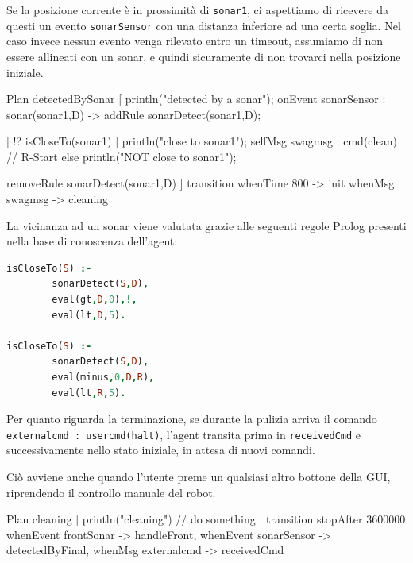 \documentclass{../llncs}
\newcommand{\codescript}[1]{{\mbox{\small{\texttt{#1}}}}\xspace}
\newcommand{\code}[1]{{\color{blue}\small{\texttt{#1}}}}
\begin{document}
Se la posizione corrente è in prossimità di \code{sonar1}, ci aspettiamo di ricevere da questi un evento \codescript{sonarSensor} con una distanza inferiore ad una certa soglia. Nel caso invece nessun evento venga rilevato entro un timeout, assumiamo di non essere allineati con un sonar, e quindi sicuramente di non trovarci nella posizione iniziale.\\

\begin{qacode}[caption={SoftwareAgent, pt2}]
Plan detectedBySonar [
	println("detected by a sonar");
	onEvent sonarSensor : sonar(sonar1,D) -> addRule sonarDetect(sonar1,D);
	
	[ !? isCloseTo(sonar1) ] {
		println("close to sonar1");
		selfMsg swagmsg : cmd(clean) // R-Start
	}
	else
		println("NOT close to sonar1");
		
	removeRule sonarDetect(sonar1,D)
]
transition
	whenTime 800 -> init
	whenMsg swagmsg -> cleaning
\end{qacode}

La vicinanza ad un sonar viene valutata grazie alle seguenti regole Prolog presenti nella base di conoscenza dell'agent:\\

\begin{lstlisting}[language=Prolog, keywordstyle=\color{black}, caption={SoftwareAgent, Rules - pt1}]
isCloseTo(S) :-
		sonarDetect(S,D),
		eval(gt,D,0),!,
		eval(lt,D,5).
	
isCloseTo(S) :-
		sonarDetect(S,D),
		eval(minus,0,D,R),
		eval(lt,R,5).
\end{lstlisting}

\vspace{8px}

Per quanto riguarda la terminazione, se durante la pulizia arriva il comando \codescript{externalcmd : usercmd(halt)}, l'agent transita prima in \codescript{receivedCmd} e successivamente nello stato iniziale, in attesa di nuovi comandi.

Ciò avviene anche quando l'utente preme un qualsiasi altro bottone della GUI, riprendendo il controllo manuale del robot.\\

\begin{qacode}[caption={SoftwareAgent, pt3}]
Plan cleaning [
	println("cleaning")
	// do something
]
transition stopAfter 3600000 
	whenEvent frontSonar -> handleFront,
	whenEvent sonarSensor -> detectedByFinal,
	whenMsg externalcmd -> receivedCmd
\end{qacode}
\end{document}
